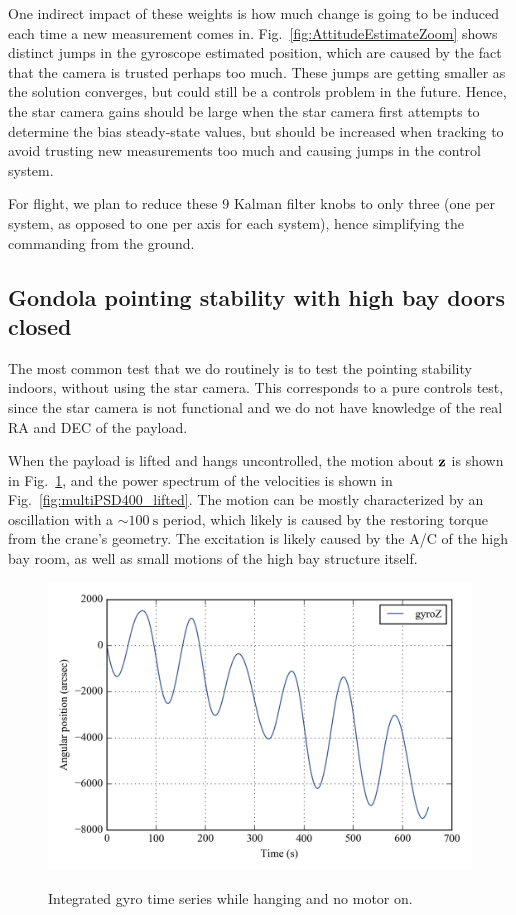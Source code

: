 One indirect impact of these weights is how much change is going to be induced each time a new measurement comes in. Fig.~\ref{fig:AttitudeEstimateZoom} shows distinct jumps in the gyroscope estimated position, which are caused by the fact that the camera is trusted perhaps too much. These jumps are getting smaller as the solution converges, but could still be a controls problem in the future. Hence, the star camera gains should be large when the star camera first attempts to determine the bias steady-state values, but should be increased when tracking to avoid trusting new measurements too much and causing jumps in the control system.

For flight, we plan to reduce these 9 Kalman filter knobs to only three (one per system, as opposed to one per axis for each system), hence simplifying the commanding from the ground.

\subsection{Gondola pointing stability with high bay doors closed}

The most common test that we do routinely is to test the pointing stability indoors, without using the star camera. This corresponds to a pure controls test, since the star camera is not functional and we do not have knowledge of the real RA and DEC of the payload. 

When the payload is lifted and hangs uncontrolled, the motion about $\textrm{\textbf{z}}$ is shown in Fig.~\ref{fig:intgralgyroZ400}, and the power spectrum of the velocities is shown in Fig.~\ref{fig:multiPSD400_lifted}. The motion can be mostly characterized by an oscillation with a $\sim\SI{100}{\second}$ period, which likely is caused by the restoring torque from the crane's geometry. The excitation is likely caused by the A/C of the high bay room, as well as small motions of the high bay structure itself.

\begin{figure}[!ht]
\begin{center}
\includegraphics{Figures/integral_lifted_gyroZ.png}
\label{fig:intgralgyroZ400}
\vspace{-0.5cm}
\caption[Integrated gyro time series while hanging]{Integrated gyro time series while hanging and no motor on.}
\end{center}
\end{figure}

